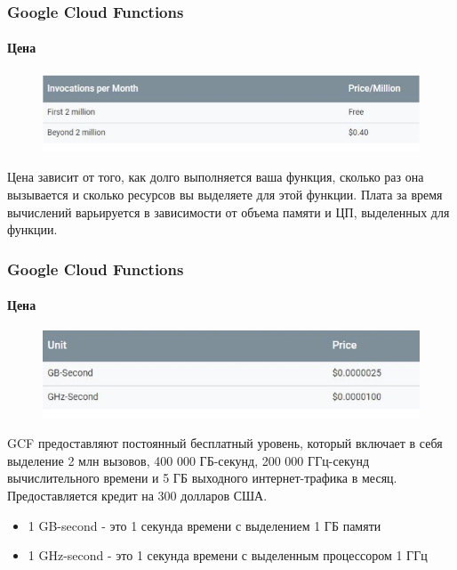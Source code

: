 \documentclass{beamer}
\begin{document}
    \begin{frame}
        \frametitle{Google Cloud Functions}
        \framesubtitle{Цена}
        \begin{figure}
            \includegraphics[width=\linewidth]{images/googlePrice-1}
        \end{figure}
        Цена зависит от того, как долго выполняется ваша функция, сколько раз она вызывается и сколько ресурсов вы выделяете для этой функции. Плата за время вычислений варьируется в зависимости от объема памяти и ЦП, выделенных для функции.
    \end{frame}

    \begin{frame}
        \frametitle{Google Cloud Functions}
        \framesubtitle{Цена}
        \begin{figure}
            \includegraphics[width=\linewidth]{images/googlePrice-2}
        \end{figure}
        GCF предоставляют постоянный бесплатный уровень, который включает в себя выделение 2 млн вызовов, 400 000 ГБ-секунд, 200 000 ГГц-секунд вычислительного времени и 5 ГБ выходного интернет-трафика в месяц.\\
        Предоставляется кредит на 300 долларов США.
        \vspace*{0.5cm}
        {
        \tiny
        \begin{itemize}
            \item 1 GB-second - это 1 секунда времени с выделением 1 ГБ памяти
            \item 1 GHz-second - это 1 секунда времени  с выделенным процессором 1 ГГц
        \end{itemize}
        }
    \end{frame}
\end{document}
